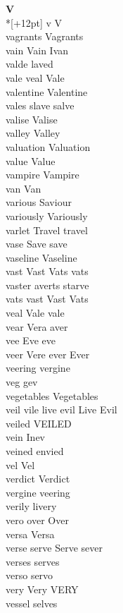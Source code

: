 \vspace{14pt}
\noindent\textbf{\Large V}\\*[+12pt]
v V\\
vagrants Vagrants\\
vain Vain Ivan\\
valde laved\\
vale veal Vale\\
valentine Valentine\\
vales slave salve\\
valise Valise\\
valley Valley\\
valuation Valuation\\
value Value\\
vampire Vampire\\
van Van\\
various Saviour\\
variously Variously\\
varlet Travel travel\\
vase Save save\\
vaseline Vaseline\\
vast Vast Vats vats\\
vaster averts starve\\
vats vast Vast Vats\\
veal Vale vale\\
vear Vera aver\\
vee Eve eve\\
veer Vere ever Ever\\
veering vergine\\
veg gev\\
vegetables Vegetables\\
veil vile live evil Live Evil\\
veiled VEILED\\
vein Inev\\
veined envied\\
vel Vel\\
verdict Verdict\\
vergine veering\\
verily livery\\
vero over Over\\
versa Versa\\
verse serve Serve sever\\
verses serves\\
verso servo\\
very Very VERY\\
vessel selves\\
